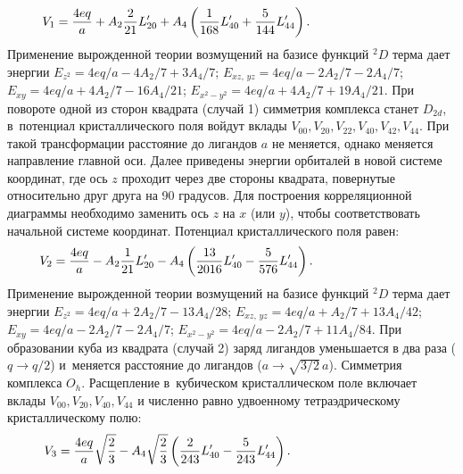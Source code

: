 \begin{equation*}
\begin{aligned}
& V_{1}= \dfrac{4eq}{a} + A_2 \dfrac{2}{21}L_{20}' + A_4 \left( \dfrac{1}{168}L_{40}'  + \dfrac{5}{144}L_{44}' \right). \hspace{28mm}
\end{aligned}
\end{equation*}
Применение вырожденной теории возмущений на базисе функций $^2D$ терма дает энергии $E_{z^2} = 4eq/a - 4A_2/7 + {3A_4}/{7}$; $E_{xz,\, yz} = 4eq/a -{2A_2}/{7} - {2A_4}/{7}$; $E_{xy} = 4eq/a + {4A_2}/{7} - {16A_4}/{21}$; $E_{x^2-y^2} = 4eq/a + {4A_2}/{7} + {19A_4}/{21}$. При повороте одной из сторон квадрата (случай 1) симметрия комплекса станет $D_{2d}$, в~потенциал кристаллического поля войдут вклады $V_{00}\text{,}\,V_{20}\text{,}\,V_{22}\text{,}\,V_{40}\text{,}\,V_{42}\text{,}\,V_{44}$. При такой трансформации расстояние до лигандов $a$ не меняется, однако меняется направление главной оси. Далее приведены энергии орбиталей в новой системе координат, где ось $z$ проходит через две стороны квадрата, повернутые относительно друг друга на 90 градусов. Для построения корреляционной диаграммы необходимо заменить ось $z$ на $x$ (или $y$), чтобы соответствовать начальной системе координат. Потенциал кристаллического поля равен:
\begin{equation*}
\begin{aligned}
& V_2= \dfrac{4eq}{a} - A_2 \dfrac{1}{21}L_{20}' - A_4 \left( \dfrac{13}{2016}L_{40}'  - \dfrac{5}{576}L_{44}' \right). \hspace{28mm}
\end{aligned}
\end{equation*}
Применение вырожденной теории возмущений на базисе функций $^2D$ терма дает энергии $E_{z^2} = 4eq/a + 2A_2/7 - {13A_4}/{28}$; $E_{xz,\, yz} = 4eq/a +{A_2}/{7} + {13A_4}/{42}$; $E_{xy} = 4eq/a - {2A_2}/{7} - {2A_4}/{7}$; $E_{x^2-y^2} = 4eq/a - {2A_2}/{7} + {11A_4}/{84}$.
При образовании куба из квадрата (случай 2) заряд лигандов уменьшается в два раза ($q \rightarrow q/2$) и~меняется расстояние до лигандов ($a \rightarrow \sqrt{3/2}\,a$). Симметрия комплекса $O_h$. Расщепление в~кубическом кристаллическом поле включает вклады $V_{00}\text{,}\,V_{20}\text{,}\,V_{40}\text{,}\,V_{44}$ и численно равно удвоенному тетраэдрическому кристаллическому полю:
\begin{equation*}
\begin{aligned}
& V_3= \dfrac{4eq}{a} \sqrt{\dfrac{2}{3}}  - A_4 \sqrt{\dfrac{2}{3}} \left( \dfrac{2}{243}L_{40}'  - \dfrac{5}{243}L_{44}' \right). \hspace{33mm}
\end{aligned}
\end{equation*}
